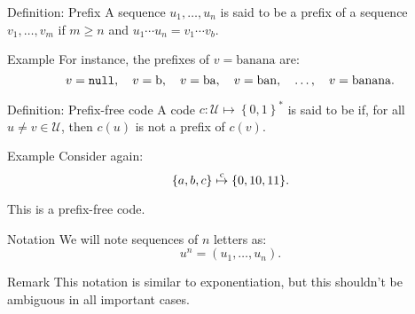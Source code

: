 \documentclass[a4paper]{article}
\begin{document}
\begin{parag}{Definition: Prefix}
    A sequence $u_1, \ldots, u_n$ is said to be a prefix of a sequence $v_1, \ldots, v_m$ if $m \geq n$ and $u_1 \cdots u_n = v_1 \cdots v_b$.
    
    \begin{subparag}{Example}
        For instance, the prefixes of $v = \text{banana}$ are: 
        \[v = \texttt{null}, \quad v = \text{b}, \quad v = \text{ba}, \quad v = \text{ban}, \quad \ldots, \quad v = \text{banana}.\]
    \end{subparag}
\end{parag}

\begin{parag}{Definition: Prefix-free code}
    A code $c: \mathcal{U} \mapsto \left\{0, 1\right\}^*$ is said to be  if, for all $u \neq v \in \mathcal{U}$, then $c\left(u\right)$ is not a prefix of $c\left(v\right)$.

    \begin{subparag}{Example}
        Consider again: 
        \[\left\{a, b, c\right\} \over{\mapsto}{c} \left\{0, 10, 11\right\}.\]
        
        This is a prefix-free code.
    \end{subparag}
\end{parag}

\begin{parag}{Notation}
    We will note sequences of $n$ letters as: 
    \[u^n = \left(u_1, \ldots, u_n\right).\]

    \begin{subparag}{Remark}
        This notation is similar to exponentiation, but this shouldn't be ambiguous in all important cases.
    \end{subparag}
\end{parag}
\end{document}
